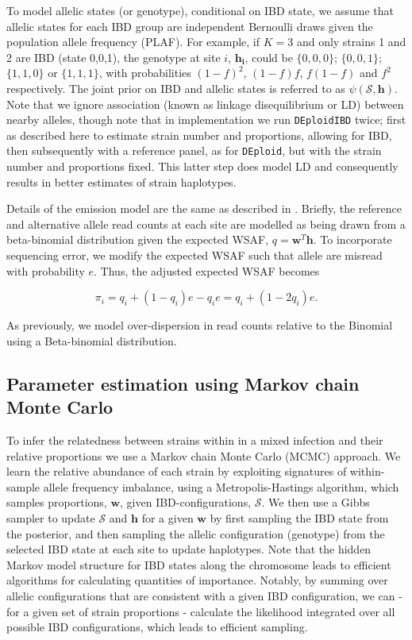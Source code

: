 \documentclass[9pt]{article}
\begin{document}
To model allelic states (or genotype), conditional on IBD state, we assume that allelic states for each IBD group are independent Bernoulli draws given the population allele frequency (PLAF).   For example, if $K=3$ and only strains 1 and 2 are IBD (state 0,0,1), the genotype at site $i$, $\mathbf{h_i}$, could be $\{0,0,0\}$; $\{0,0,1\}$; $\{1,1,0\}$ or $\{1,1,1\}$, with probabilities $(1-f)^2$, $(1-f)f$, $f(1-f)$ and $f^2$ respectively.   The joint prior on IBD and allelic states is referred to as $\psi(\mathcal{S},\mathbf{h})$.  Note that we ignore association (known as linkage disequilibrium or LD) between nearby alleles, though note that in implementation we run \texttt{DEploidIBD} twice; first as described here to estimate strain number and proportions, allowing for IBD, then subsequently with a reference panel, as for \texttt{DEploid}, but with the strain number and proportions fixed.  This latter step does model LD and consequently results in better estimates of strain haplotypes.

Details of the emission model are the same as described in \citet{Zhu2017}.  Briefly, the reference and alternative allele read counts at each site are modelled as being drawn from a beta-binomial distribution given the expected WSAF, $q = \mathbf{w}^T \mathbf{h}$.  To incorporate sequencing error, we modify the expected WSAF such that allele are misread with probability $e$. Thus, the adjusted expected WSAF becomes

\begin{equation}
\pi_i = q_i + (1 - q_i)e - q_ie = q_i + (1 - 2q_i)e.\label{eqn:adj_q}
\end{equation}

\noindent As previously, we model over-dispersion in read counts relative to the Binomial using a Beta-binomial distribution. 


\subsection{Parameter estimation using Markov chain Monte Carlo}

To infer the relatedness between strains within in a mixed infection and their relative proportions we use a Markov chain Monte Carlo (MCMC) approach. We learn the relative abundance of each strain by exploiting signatures of within-sample allele frequency imbalance, using a Metropolis-Hastings algorithm, which samples proportions, $\mathbf{w}$,  given IBD-configurations, $\mathcal{S}$. We then use a Gibbs sampler to update $\mathcal{S}$ and $\mathbf{h}$ for a given $\mathbf{w}$ by first sampling the IBD state from the posterior, and then sampling the allelic configuration (genotype) from the selected IBD state at each site to update haplotypes.  Note that the hidden Markov model structure for IBD states along the chromosome leads to efficient algorithms for calculating quantities of importance.  Notably, by summing over allelic configurations that are consistent with a given IBD configuration, we can - for a given set of strain proportions - calculate the likelihood integrated over all possible IBD configurations, which leads to efficient sampling.  
\end{document}
